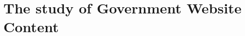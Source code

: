 \documentclass[11pt]{article}
\begin{document}

\vspace{-.2cm}
\section{The study of Government Website Content} \vspace{-.2cm}



\end{document}
